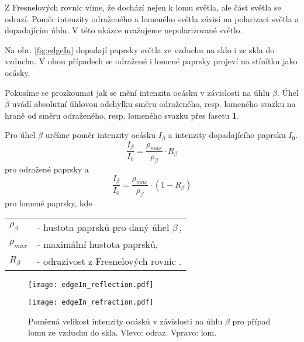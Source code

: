 Z Fresnelových rovnic \cite{Handbook} víme, že dochází nejen k lomu světla, ale část světla se odrazí. Poměr intenzity odraženého a lomeného světla závisí na polarizaci světla a dopadajícím úhlu. V této ukázce uvažujeme nepolarizované světlo. 

Na obr. \ref{fig:edgeIn} dopadají paprsky světla ze vzduchu na sklo i ze skla do vzduchu. V obou případech se odražené i lomené paprsky projeví  na stínítku jako ocásky.

Pokusíme se prozkoumat jak se mění intenzita ocásku v závislosti na úhlu $\beta$. Úhel $\beta$ uvádí absolutní úhlovou odchylku směru odraženého, resp. lomeného svazku na hraně od směru odraženého, resp. lomeného svazku přes fasetu \textbf{1}.  

Pro úhel $\beta$ určíme poměr intenzity ocásku $I_{\beta}$ a intenzity dopadajícího paprsku $I_0$. 
\begin{equation}
 \frac{I_\beta}{I_0}  = \frac{\rho_{{max}}}{\rho_\beta}\cdot R_\beta
\end{equation}
pro odražené paprsky a 
\begin{equation}
 \frac{I_\beta}{I_0}  = \frac{\rho_{max}}{\rho_\beta}\cdot (1-R_\beta)
\end{equation}
pro lomené paprsky, kde  

	\begin{tabular}{l l}
	$\rho_{\beta}$  & 	- hustota paprsků pro daný úhel $\beta\,$,\\
	$\rho_{{max}}$ 	&	- maximální hustota paprsků,\\
	$R_\beta$		&	- odrazivost z Fresnelových rovnic \cite{Handbook}.	 \\
	
	\end{tabular}
	\vspace{1mm}

\begin{figure}[h!]
\centering
\begin{minipage}[c]{0.48\textwidth}
\texttt{[image: edgeIn\_reflection.pdf]}
\end{minipage}
\begin{minipage}[c]{0.48\textwidth}
\texttt{[image: edgeIn\_refraction.pdf]}
\end{minipage}
\caption[Poměrná velikost intenzity ocásku případ lomu ze vzduchu do skla.]{Poměrná velikost intenzity ocásků v závislosti na úhlu $\beta$ pro případ lomu ze vzduchu do skla. Vlevo: odraz. Vpravo: lom.}
\label{fig:edgeInGraf}
\end{figure}

